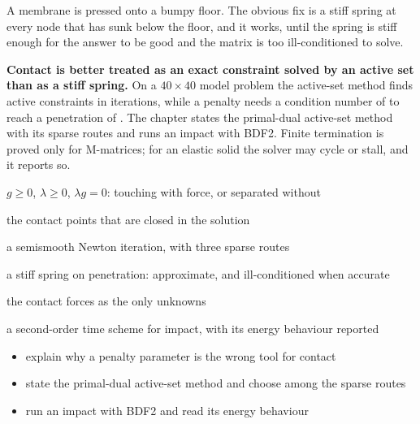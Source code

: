 \newpage\thispagestyle{hl}
\begin{hlquote}A membrane is pressed onto a bumpy floor. The obvious fix is a stiff spring at every node that has sunk below the floor, and it works, until the spring is stiff enough for the answer to be good and the matrix is too ill-conditioned to solve.\end{hlquote}
\vspace{8pt}\begin{hlsum}\textbf{Contact is better treated as an exact constraint solved by an active set than as a stiff spring.} On a $40\times40$ model problem the active-set method finds \ctcObsActive{} active constraints in \ctcObsIt{} iterations, while a penalty needs a condition number of \ctcCondAtEight{} to reach a penetration of \ctcPenAtEight. The chapter states the primal-dual active-set method with its sparse routes and runs an impact with BDF2. Finite termination is proved only for M-matrices; for an elastic solid the solver may cycle or stall, and it reports so.\end{hlsum}
\begin{description}\setlength\itemsep{5pt}\setlength\parsep{0pt}\renewcommand{\descriptionlabel}[1]{\hspace{\labelsep}\sffamily\bfseries\color{hlnavy}#1}
\item[Gap and complementarity] $g\ge0$, $\lambda\ge0$, $\lambda g=0$: touching with force, or separated without
\item[Active set] the contact points that are closed in the solution
\item[Primal-dual active-set method] a semismooth Newton iteration, with three sparse routes
\item[Penalty method] a stiff spring on penetration: approximate, and ill-conditioned when accurate
\item[Linear complementarity problem] the contact forces as the only unknowns
\item[BDF2] a second-order time scheme for impact, with its energy behaviour reported
\end{description}
\begin{itemize}\setlength\itemsep{3pt}
\item explain why a penalty parameter is the wrong tool for contact
\item state the primal-dual active-set method and choose among the sparse routes
\item run an impact with BDF2 and read its energy behaviour
\end{itemize}
